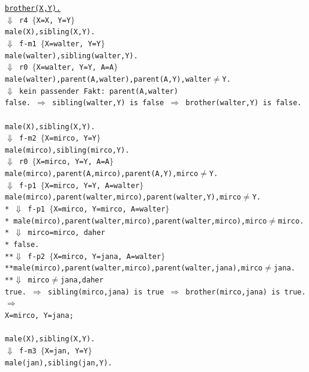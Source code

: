 \documentclass[a4paper, dvipsnames]{article}
\begin{document}
{ \texttt{\underline{brother(X,Y).}\\
 $\Downarrow$ r4 $\lbrace$X=X, Y=Y$\rbrace$\\
 male(X),sibling(X,Y).\\
 $\Downarrow$ f-m1 $\lbrace$X=walter, Y=Y$\rbrace$\\
 male(walter),sibling(walter,Y).\\
 $\Downarrow$ r0 $\lbrace$X=walter, Y=Y, A=A$\rbrace$\\
 male(walter),parent(A,walter),parent(A,Y),walter$\neq$Y.\\
 $\Downarrow$  kein passender Fakt: parent(A,walter)\\
 false. $\Rightarrow$ sibling(walter,Y)  is false $\Rightarrow$ brother(walter,Y) is false. \\
 \\
 male(X),sibling(X,Y).\\
 $\Downarrow$ f-m2 $\lbrace$X=mirco, Y=Y$\rbrace$\\
 male(mirco),sibling(mirco,Y).\\
 $\Downarrow$ r0 $\lbrace$X=mirco, Y=Y, A=A$\rbrace$\\
 male(mirco),parent(A,mirco),parent(A,Y),mirco$\neq$Y. \\
 $\Downarrow$ f-p1 $\lbrace$X=mirco, Y=Y, A=walter$\rbrace$\\
 male(mirco),parent(walter,mirco),parent(walter,Y),mirco$\neq$Y. \\
*  $\Downarrow$ f-p1 $\lbrace$X=mirco, Y=mirco, A=walter$\rbrace$\\
* male(mirco),parent(walter,mirco),parent(walter,mirco),mirco$\neq$mirco. \\
*  $\Downarrow$  mirco=mirco, daher\\
* false. \\
**$\Downarrow$ f-p2 $\lbrace$X=mirco, Y=jana, A=walter$\rbrace$\\
**male(mirco),parent(walter,mirco),parent(walter,jana),mirco$\neq$jana. \\
**$\Downarrow$ mirco$\neq$jana,daher \\
true. $\Rightarrow$ sibling(mirco,jana)  is true $\Rightarrow$ brother(mirco,jana) is true. $\Rightarrow$\\
 X=mirco, Y=jana;\\
\\
male(X),sibling(X,Y).\\
 $\Downarrow$ f-m3 $\lbrace$X=jan, Y=Y$\rbrace$\\
 male(jan),sibling(jan,Y).\\
}}
\end{document}
